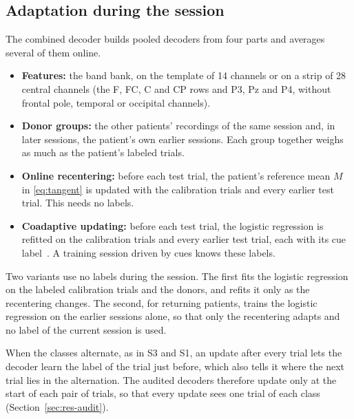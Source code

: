 \documentclass{ieeeaccess}
\begin{document}
\subsection{Adaptation during the session}\label{sec:adapt}

The combined decoder builds pooled decoders from four parts and averages several of them online.
\begin{itemize}
\item \textbf{Features:} the band bank, on the template of 14 channels or on a strip of 28 central channels (the F, FC, C and CP rows and P3, Pz and P4, without frontal pole, temporal or occipital channels).
\item \textbf{Donor groups:} the other patients' recordings of the same session and, in later sessions, the patient's own earlier sessions. Each group together weighs as much as the patient's labeled trials.
\item \textbf{Online recentering:} before each test trial, the patient's reference mean $M$ in \eqref{eq:tangent} is updated with the calibration trials and every earlier test trial. This needs no labels.
\item \textbf{Coadaptive updating:} before each test trial, the logistic regression is refitted on the calibration trials and every earlier test trial, each with its cue label~\cite{vidaurre2011}. A training session driven by cues knows these labels.
\end{itemize}
Two variants use no labels during the session. The first fits the logistic regression on the labeled calibration trials and the donors, and refits it only as the recentering changes. The second, for returning patients, trains the logistic regression on the earlier sessions alone, so that only the recentering adapts and no label of the current session is used.

When the classes alternate, as in S3 and S1, an update after every trial lets the decoder learn the label of the trial just before, which also tells it where the next trial lies in the alternation. The audited decoders therefore update only at the start of each pair of trials, so that every update sees one trial of each class (Section~\ref{sec:res-audit}).
\end{document}
